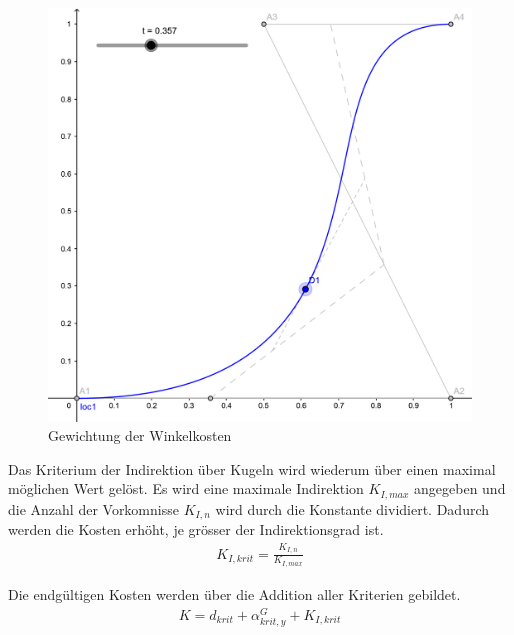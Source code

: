 \begin{figure}[h!]
    \begin{center}
        \includegraphics[width=0.4\linewidth]{../common/03_billiard_ai/resources/30_suchbaum_gewichtung_winkelkosten.png}
    \end{center}
    \caption{Gewichtung der Winkelkosten}
    \label{fig:suche_knoten_gewichtung_winkelkosten}
\end{figure}

Das Kriterium der Indirektion über Kugeln wird wiederum über einen maximal möglichen Wert gelöst.
Es wird eine maximale Indirektion $K_{I,max}$ angegeben und die Anzahl der Vorkomnisse ${K_{I,n}}$ wird durch die
Konstante dividiert. Dadurch werden die Kosten erhöht, je grösser der Indirektionsgrad ist.
\begin{align}
    K_{I,krit} = \frac{K_{I,n}}{K_{I,max}}
\end{align}

Die endgültigen Kosten werden über die Addition aller Kriterien gebildet.
\begin{align}
    K = d_{krit} + \alpha^G_{krit, y} + K_{I,krit}
\end{align}

